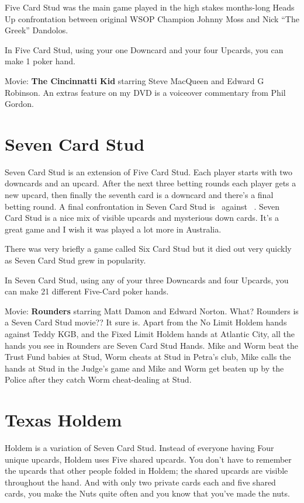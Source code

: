 Five Card Stud was the main game played in the high stakes months-long
Heads Up confrontation between original WSOP Champion Johnny Moss and
Nick ``The Greek'' Dandolos. 

In Five Card Stud, using your one Downcard and your four Upcards, you
can make 1 poker hand.

Movie: \textbf{The Cincinnatti Kid} starring Steve MacQueen and Edward G
Robinson. An extras feature on my DVD is a voiceover commentary from
Phil Gordon.

\section{Seven Card Stud}

Seven Card Stud is an extension of Five Card Stud. Each player starts
with two downcards and an upcard. After the next three betting rounds
each player gets a new upcard, then finally the seventh card is a
downcard and there's a final betting round. A final confrontation in
Seven Card Stud is \back\back\nines\Qd\Jd\tred\back\ against
\back\back\fourh\Jh\tend\trec\back\ . Seven Card Stud is a nice mix of
visible upcards and mysterious down cards. It's a great game and I
wish it was played a lot more in Australia.

There was very briefly a game called Six Card Stud but it died out
very quickly as Seven Card Stud grew in popularity.

In Seven Card Stud, using any of your three Downcards and four
Upcards, you can make 21 different Five-Card poker hands.

Movie: \textbf{Rounders} starring Matt Damon and Edward Norton.
What? Rounders is a Seven Card Stud movie?? It sure is. Apart from the
No Limit Holdem hands against Teddy KGB, and the Fixed Limit Holdem
hands at Atlantic City, all the hands you see in Rounders are Seven
Card Stud Hands. Mike and Worm beat the Trust Fund babies at Stud,
Worm cheats at Stud in Petra's club, Mike calls the hands at Stud in
the Judge's game and Mike and Worm get beaten up by the Police after
they catch Worm cheat-dealing at Stud.

\section{Texas Holdem}

Holdem is a variation of Seven Card Stud. Instead of everyone
having Four unique upcards, Holdem uses Five shared upcards. You don't
have to remember the upcards that other people folded in Holdem; the
shared upcards are visible throughout the hand. And with only two
private cards each and five shared cards, you make the Nuts quite often
and you know that you've made the nuts.

